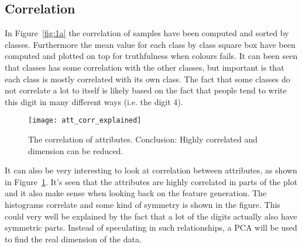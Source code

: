 \subsection{Correlation}
In Figure~\ref{fig:1a} the correlation of samples have been computed and sorted by classes. Furthermore the mean value for each class by class square box have been computed and plotted on top for truthfulness when colours fails. It can been seen that classes has some correlation with the other classes, but important is that each class is mostly correlated with its own class. The fact that some classes do not correlate a lot to itself is likely based on the fact that people tend to write this digit in many different ways (i.e. the digit 4).

\begin{figure}[H]
\centering
\texttt{[image: att\_corr\_explained]}
\caption{The correlation of attributes. Conclusion: Highly correlated and dimension can be reduced.\label{fig:att_corr_explained}}
\end{figure}

It can also be very interesting to look at correlation between attributes, as shown in Figure~\ref{fig:att_corr_explained}. It's seen that the attributes are highly correlated in parts of the plot and it also make sense when looking back on the feature generation. The histograms correlate and some kind of symmetry is shown in the figure. This could very well be explained by the fact that a lot of the digits actually also have symmetric parts. Instead of speculating in such relationships, a PCA will be used to find the real dimension of the data.  



